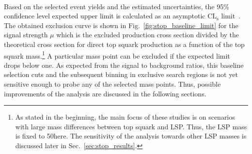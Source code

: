 \begin{table}[!t]
\centering
\caption{Total event yields obtained from simulated samples after the baseline selection described in the text (\textit{first column}) as well as event yields for the various signal regions (\textit{column two to five}). All numbers are scaled to 19.5\fbinv. The signal points are labelled as (X, Y) where X is the top squark mass and Y is the LSP mass in GeV. Furthermore, the signal over background ratios are displayed for the two signal points in squared brackets. }
 \resizebox{\textwidth}{!}{%
\begin{tabular}{llllll}
\multicolumn{6}{c}{} \\
  \toprule
    & total & SR1 & SR2 & SR3 & SR4  \\
  \midrule
   \ttbar & 16461 & 13525 & 754 & 1868 & 314 \\
   \WJets & 12481 & 9660 & 1516 & 985 & 320 \\
   \ZJets & 11837 & 8155 & 2425 & 810 & 447 \\
   QCD multijet & 20013 & 19574 & 0 & 397 & 42 \\
   \midrule
   Signal (600, 50) & 1012 [16.6$\cdot 10^{-3}$] & 416 [8.2$\cdot 10^{-3}$] & 389 [82.8$\cdot 10^{-3}$] & 101 [24.9$\cdot 10^{-3}$] & 106 [94.6$\cdot 10^{-3}$]  \\
   Signal (1100, 50) & 29 [0.5$\cdot 10^{-3}$] & 2 [0.05$\cdot 10^{-3}$] & 8 [1.7$\cdot 10^{-3}$] & 3 [0.7$\cdot 10^{-3}$] & 16 [14.0$\cdot 10^{-3}$]  \\
  \bottomrule
\end{tabular}}
\label{tab:stop_baseline_cutflow}
\end{table}   
\\
Based on the selected event yields and the estimated uncertainties, the 95\% confidence level expected upper limit is calculated as an asymptotic $\mathrm{CL_s}$ limit~\cite{bib:theta}. The obtained exclusion curve is shown in Fig.~\ref{fig:stop_baseline_limit} for the signal strength $\mu$ which is the excluded production cross section divided by the theoretical cross section for direct top squark production as a function of the top squark mass.\footnote{As stated in the beginning, the main focus of these studies is on scenarios with large mass differences between top squark and LSP. Thus, the LSP mass is fixed to 50\gev here. The sensitivity of the analysis towards other LSP masses is discussed later in Sec.~\ref{sec:stop_results}.} A particular mass point can be excluded if the expected limit drops below one. As expected from the signal to background ratios, this baseline selection cuts and the subsequent binning in exclusive search regions is not yet sensitive enough to probe any of the selected mass points. Thus, possible improvements of the analysis are discussed in the following sections.  
